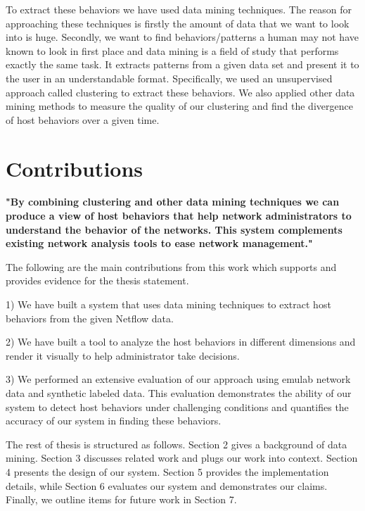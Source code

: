 To extract these behaviors we have used data mining techniques. The reason for approaching these techniques is firstly the amount of data that we want to look into is huge. Secondly, we want to find behaviors/patterns a human may not have known to look in first place and data mining is a field of study that performs exactly the same task. It extracts patterns from a given data set and present it to the user in an understandable format. Specifically, we used an unsupervised approach called clustering to extract these behaviors. We also applied other data mining methods to measure the quality of our clustering and find the divergence of host behaviors over a given time.  


\section{Contributions} \label{contributions}
\textbf{"By combining clustering and other data mining techniques we can produce a view of host behaviors that help network administrators to understand the behavior of the networks. This system complements existing network analysis tools to ease network management."}

The following are the main contributions from this work which supports and provides evidence for the thesis statement.

1) We have built a system that uses data mining techniques to extract host behaviors from the given Netflow data.

2) We have built a tool to analyze the host behaviors in different dimensions and render it visually to help administrator take decisions.

3) We performed an extensive evaluation of our approach using
emulab network data and synthetic labeled data. This evaluation
demonstrates the ability of our system to detect host behaviors under challenging conditions and quantifies the accuracy of our system in finding these behaviors.

The rest of thesis is structured as follows. Section 2 gives a background of data mining. Section 3 discusses related work and plugs our work into context. Section 4 presents the design of our system. Section 5 provides the implementation details, while  Section 6 evaluates our system  and demonstrates our claims. Finally, we outline items for future work in Section 7.
